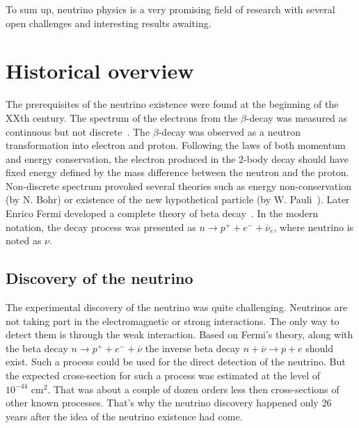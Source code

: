 \documentclass[../main.tex]{subfiles}
\begin{document}
To sum up, neutrino physics is a very promising field of research with several open challenges and interesting results awaiting.

\section{Historical overview}
\label{sec:hist}
The prerequisites of the neutrino existence were found at the beginning of the XXth century. The spectrum of the electrons from the $\beta$-decay was measured as continuous but not discrete~\cite{Chadwick1914}. The $\beta$-decay was observed as a neutron transformation into electron and proton. Following the laws of both momentum and energy conservation, the electron produced in the 2-body decay should have fixed energy defined by the mass difference between the neutron and the proton. Non-discrete spectrum provoked several theories such as energy non-conservation (by N. Bohr) or existence of the new hypothetical particle (by W. Pauli~\cite{Pauli1930}). Later Enrico Fermi developed a complete theory of beta decay~\cite{Fermi1934}. In the modern notation, the decay process was presented as $n\to p^++e^-+\overline{\nu}_e$, where neutrino is noted as $\nu$.

\subsection{Discovery of the neutrino}
The experimental discovery of the neutrino was quite challenging. Neutrinos are not taking part in the electromagnetic or strong interactions. The only way to detect them is through the weak interaction. Based on Fermi's theory, along with the beta decay $n\to p^++e^-+\overline{\nu}$ the inverse beta decay $n+\overline{\nu}\to p+e$ should exist. Such a process could be used for the direct detection of the neutrino. But the expected cross-section for such a process was estimated at the level of $10^{-44} \text{ cm}^2$. That was about a couple of dozen orders less then cross-sections of other known processes. That's why the neutrino discovery happened only 26 years after the idea of the neutrino existence had come.
\end{document}
